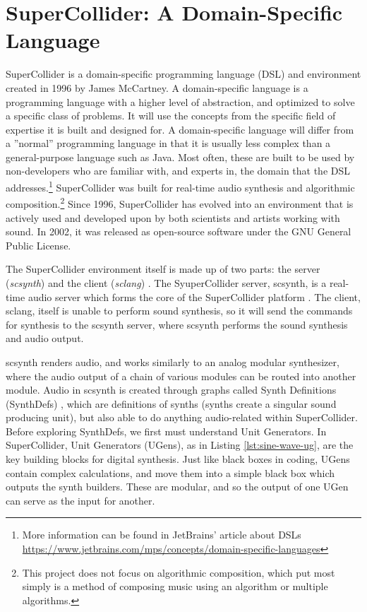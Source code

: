\section[SuperCollider: A Domain-Specific Language]{SuperCollider: A Domain-Specific Language}\label{chapter:supercollider}

SuperCollider is a domain-specific programming language (DSL) and environment created in 1996 by James McCartney\cite{McCartney_2002}. A domain-specific language is a programming language with a higher level of abstraction, and optimized to solve a specific class of problems. It will use the concepts from the specific field of expertise it is built and designed for. A domain-specific language will differ from a ''normal'' programming language in that it is usually less complex than a general-purpose language such as Java. Most often, these are built to be used by non-developers who are familiar with, and experts in, the domain that the DSL addresses.\footnote{More information can be found in JetBrains' article about DSLs  \url{https://www.jetbrains.com/mps/concepts/domain-specific-languages}} SuperCollider was built for real-time audio synthesis and algorithmic composition.\footnote{This project does not focus on algorithmic composition, which put most simply is a method of composing music using an algorithm or multiple algorithms.} Since 1996, SuperCollider has evolved into an environment that is actively used and developed upon by both scientists and artists working with sound. In 2002, it was released as open-source software under the GNU General Public License.

The SuperCollider environment itself is made up of two parts: the server (\textit{scsynth}) and the client (\textit{sclang}) \cite{McCartney_2002}. The SyuperCollider server, scsynth, is a real-time audio server which forms the core of the SuperCollider platform \cite{McCartney_2021}. The client, sclang, itself is unable to perform sound synthesis, so it will send the commands for synthesis to the scsynth server, where scsynth performs the sound synthesis and audio output.

scsynth renders audio, and works similarly to an analog modular synthesizer, where the audio output of a chain of various modules can be routed into another module. Audio in scsynth is created through graphs called Synth Definitions (SynthDefs) \cite{McCartney_2002}, which are definitions of synths (synths create a singular sound producing unit), but also able to do anything audio-related within SuperCollider. Before exploring SynthDefs, we first must understand Unit Generators. In SuperCollider, Unit Generators (UGens), as in Listing \ref{lst:sine-wave-ug}, are the key building blocks for digital synthesis. Just like black boxes in coding, UGens contain complex calculations, and move them into a simple black box which outputs the synth builders. These are modular, and so the output of one UGen can serve as the input for another. 

